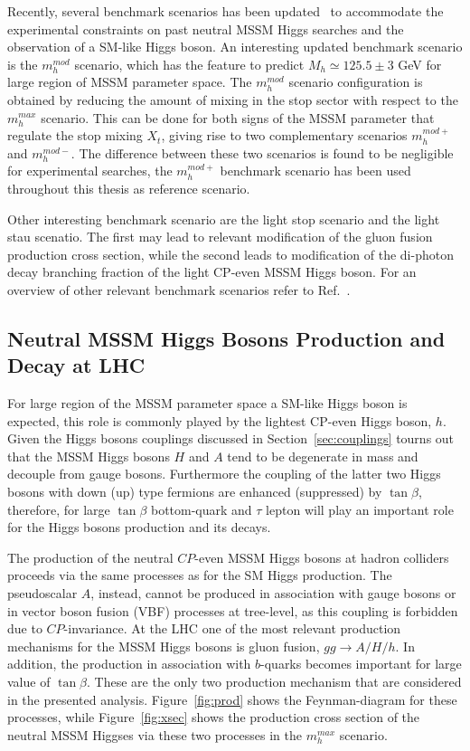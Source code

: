 Recently, several benchmark scenarios has been updated~\cite{LHCxsec} to  
accommodate the experimental constraints on past neutral MSSM Higgs searches and the observation of a SM-like Higgs boson.
An interesting updated benchmark scenario is the $m_h^{mod}$ scenario, which has the feature to predict $M_h \simeq 125.5 \pm 3 $ GeV 
for large region of MSSM parameter space.  The $m_h^{mod}$ scenario configuration is obtained by reducing the amount 
of mixing in the stop sector with respect to  the  $m_h^{max}$ scenario. This can be done for both signs of the MSSM parameter that 
regulate the stop mixing $X_t$, giving rise to two complementary scenarios $m_h^{mod+}$ and $m_h^{mod-}$.
The difference between these two scenarios is found to be negligible for experimental searches, the $m_h^{mod+}$ 
benchmark scenario has been used throughout this thesis as reference scenario.

Other interesting benchmark scenario are the light stop scenario and the light stau scenatio.
The first may lead to relevant modification of the gluon fusion production cross section, while the second leads
to modification of the di-photon decay branching fraction of the light CP-even MSSM Higgs boson.
For an overview of other relevant  benchmark scenarios refer to Ref.~\cite{LHCxsec}. 



 


\subsection{Neutral MSSM Higgs Bosons Production and Decay at LHC}
For large region of the MSSM parameter space a SM-like Higgs boson is expected, 
this role is commonly played by the lightest CP-even Higgs boson, $h$. 
Given the Higgs bosons couplings discussed in Section~\ref{sec:couplings} tourns out that the MSSM Higgs bosons $H$ and $A$
tend to be degenerate in mass and decouple from gauge bosons. Furthermore the coupling of the latter
two Higgs bosons with down (up) type fermions are enhanced (suppressed) by $\tan\beta$, therefore, for large $\tan\beta$
bottom-quark and $\tau$ lepton will play an important role for 
the Higgs bosons production and its decays.  

The production of the neutral $CP$-even MSSM Higgs bosons at hadron
colliders proceeds via the same processes as for the SM Higgs
production. The pseudoscalar $A$, instead, cannot be produced
in association with gauge bosons or in vector boson fusion (VBF) processes at
tree-level, as this coupling is forbidden due to $CP$-invariance.  At
the LHC one of the most relevant production mechanisms for the MSSM
Higgs bosons is gluon fusion, $gg\rightarrow A/H/h$. In
addition, the production in association with $b$-quarks becomes
important for large value of $\tan\beta$. These are the only two production mechanism
that are considered in the presented analysis. Figure~\ref{fig:prod} shows the Feynman-diagram
for these processes, while Figure~\ref{fig:xsec} shows the production cross section of the neutral 
MSSM Higgses via these two processes in the $m_h^{max}$ scenario.


